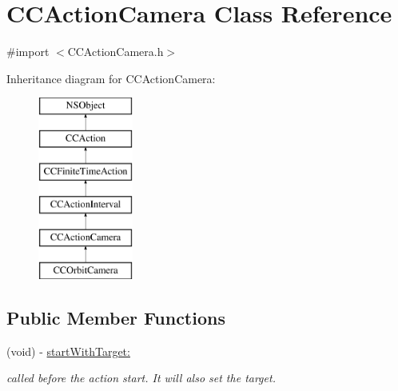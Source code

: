 \hypertarget{interface_c_c_action_camera}{\section{C\-C\-Action\-Camera Class Reference}
\label{interface_c_c_action_camera}
}


{\ttfamily \#import $<$C\-C\-Action\-Camera.\-h$>$}

Inheritance diagram for C\-C\-Action\-Camera\-:\begin{figure}[H]
\begin{center}
\leavevmode
\includegraphics[height=6.000000cm]{interface_c_c_action_camera}
\end{center}
\end{figure}
\subsection*{Public Member Functions}
\begin{DoxyCompactItemize}
\item 
\hypertarget{interface_c_c_action_camera_a268c802ba6eac671c3ccd59fa9804c63}{(void) -\/ \hyperlink{interface_c_c_action_camera_a268c802ba6eac671c3ccd59fa9804c63}{start\-With\-Target\-:}}\label{interface_c_c_action_camera_a268c802ba6eac671c3ccd59fa9804c63}

\begin{DoxyCompactList}\small\item\em called before the action start. It will also set the target. \end{DoxyCompactList}\end{DoxyCompactItemize}
